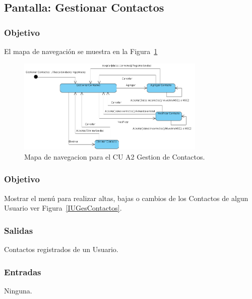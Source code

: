 \subsection{Pantalla: Gestionar Contactos}
\subsubsection{Objetivo}
	El mapa de navegación se muestra en la Figura~\ref{fig:mapaNavegacionCUA2}

  \begin{figure}[hbpt!]
		\centering
			\includegraphics[width=0.8\textwidth]{images/CUA2/MapaNavegacion.png}
		\caption{Mapa de navegacion para el CU A2 Gestion de Contactos.}
		\label{fig:mapaNavegacionCUA2}
	\end{figure}

\subsubsection{Objetivo}
Mostrar el menú para realizar altas, bajas o cambios de los Contactos de algun Usuario ver Figura~\ref{IUGesContactos}.



\subsubsection{Salidas}
Contactos registrados de un Usuario.

\subsubsection{Entradas}
Ninguna.


